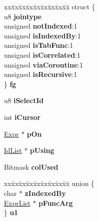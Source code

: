 \begin{DoxyCompactItemize}
\item 
\begin{tabbing}
xx\=xx\=xx\=xx\=xx\=xx\=xx\=xx\=xx\=\kill
struct \{\\
\>u8 {\bfseries jointype}\\
\>unsigned {\bfseries notIndexed}:1\\
\>unsigned {\bfseries isIndexedBy}:1\\
\>unsigned {\bfseries isTabFunc}:1\\
\>unsigned {\bfseries isCorrelated}:1\\
\>unsigned {\bfseries viaCoroutine}:1\\
\>unsigned {\bfseries isRecursive}:1\\
\} {\bfseries fg}\hypertarget{structSrcList_1_1SrcList__item_a2defa6cd914167188e8e8ee48d173922}{}\label{structSrcList_1_1SrcList__item_a2defa6cd914167188e8e8ee48d173922}
\\

\end{tabbing}\item 
u8 {\bfseries i\+Select\+Id}\hypertarget{structSrcList_1_1SrcList__item_a099cfe9b7559b42c49dda02e57188738}{}\label{structSrcList_1_1SrcList__item_a099cfe9b7559b42c49dda02e57188738}

\item 
int {\bfseries i\+Cursor}\hypertarget{structSrcList_1_1SrcList__item_af2e8aae90bd7a00b814db5a2d31f6607}{}\label{structSrcList_1_1SrcList__item_af2e8aae90bd7a00b814db5a2d31f6607}

\item 
\hyperlink{structExpr}{Expr} $\ast$ {\bfseries p\+On}\hypertarget{structSrcList_1_1SrcList__item_a525f683af2ffa8f094d941a5a4972720}{}\label{structSrcList_1_1SrcList__item_a525f683af2ffa8f094d941a5a4972720}

\item 
\hyperlink{structIdList}{Id\+List} $\ast$ {\bfseries p\+Using}\hypertarget{structSrcList_1_1SrcList__item_a38ecf205dcaebad098b73c56e48ba944}{}\label{structSrcList_1_1SrcList__item_a38ecf205dcaebad098b73c56e48ba944}

\item 
Bitmask {\bfseries col\+Used}\hypertarget{structSrcList_1_1SrcList__item_a4fd7e7e26995048b58006d020e8c48d6}{}\label{structSrcList_1_1SrcList__item_a4fd7e7e26995048b58006d020e8c48d6}

\item 
\begin{tabbing}
xx\=xx\=xx\=xx\=xx\=xx\=xx\=xx\=xx\=\kill
union \{\\
\>char $\ast$ {\bfseries zIndexedBy}\\
\>\hyperlink{structExprList}{ExprList} $\ast$ {\bfseries pFuncArg}\\
\} {\bfseries u1}\hypertarget{structSrcList_1_1SrcList__item_a97bae7bc42769542d1ad49452a5016c9}{}\label{structSrcList_1_1SrcList__item_a97bae7bc42769542d1ad49452a5016c9}
\\


\end{tabbing}
\end{DoxyCompactItemize}
